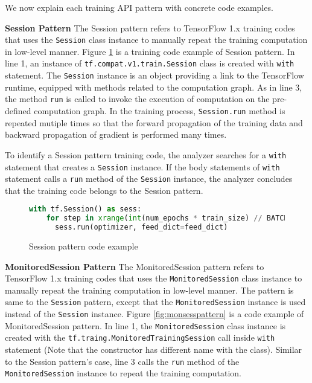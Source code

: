 We now explain each training API pattern with concrete code examples.

\textbf{Session Pattern} 
The Session pattern refers to TensorFlow 1.x training codes that
uses the {\tt Session} class instance to manually repeat the training 
computation in low-level manner.
Figure \ref{fig:sessionpattern} is a training code example of 
Session pattern.
In line 1, an instance of {\tt tf.compat.v1.train.Session} class is 
created with {\tt with} statement.
The {\tt Session} instance is an object providing a link to 
the TensorFlow runtime, equipped with methods related to the computation graph.
As in line 3, the method {\tt run} is called to invoke the
execution of computation on the pre-defined computation graph.
In the training process, {\tt Session.run} method is repeated mutiple times
so that the forward propagation of the training data and
backward propagation of gradient is performed many times.

To identify a Session pattern training code,
the analyzer searches for a {\tt with} statement that creates a
{\tt Session} instance.
If the body statements of {\tt with} statement calls a 
{\tt run} method of the {\tt Session} instance,
the analyzer concludes that the training code belongs to the Session pattern.

\begin{figure}[!ht]
\begin{lstlisting}[language=Python]
with tf.Session() as sess:
    for step in xrange(int(num_epochs * train_size) // BATCH_SIZE):
      sess.run(optimizer, feed_dict=feed_dict)
\end{lstlisting}
\caption{Session pattern code example}
\label{fig:sessionpattern}
\end{figure}

\textbf{MonitoredSession Pattern}
The MonitoredSession pattern refers to TensorFlow 1.x training codes that
uses the {\tt MonitoredSession} class instance to manually repeat
the training computation in low-level manner.
The pattern is same to the {\tt Session} pattern, except that the
{\tt MonitoredSession} instance is used instead of the {\tt Session} instance.
Figure \ref{fig:monsesspattern} is a code example of MonitoredSession pattern.
In line 1, the {\tt MonitoredSession} class instance is created with
the {\tt tf.traing.MonitoredTrainingSession} call inside {\tt with} statement
(Note that the constructor has different name with the class).
Similar to the Session pattern's case, line 3 calls the {\tt run} method of the
{\tt MonitoredSession} instance to repeat the training computation.

